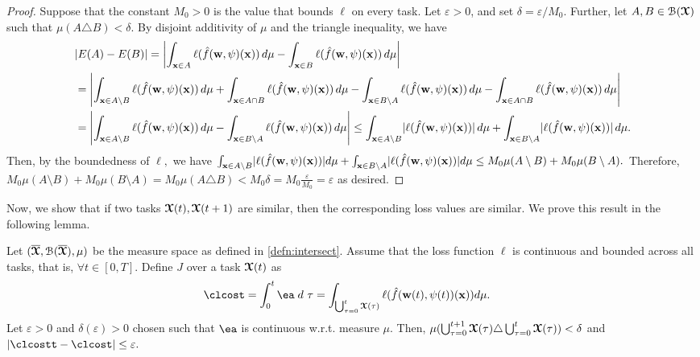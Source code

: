 \begin{proof}
    Suppose that the constant $M_0>0$ is the value that bounds $\ell$ on every task. Let $\varepsilon>0$, and set $\delta = \varepsilon/M_0.$ Further, let $A,B\in \mathcal{B}(\boldsymbol{\mathcal{X}})$ such that $\mu(A\triangle B)<\delta.$ By disjoint additivity of $\mu$ and the triangle inequality, we have
    {\small\begin{align*}
        & \lvert E(A)-E(B) \rvert = \left\vert \int_{\boldsymbol{\mathrm{x}}\in A}
       \ell(\hat{f}(\boldsymbol{\mathrm{w}},\psi)( \boldsymbol{\mathrm{x}} ))\,d\mu - \int_{\boldsymbol{\mathrm{x}}\in B}
       \ell(\hat{f}(\boldsymbol{\mathrm{w}},\psi)( \boldsymbol{\mathrm{x}} ))\,d\mu\right\vert \\ &= \left\vert \int_{\boldsymbol{\mathrm{x}}\in A\setminus B}
       \ell(\hat{f}(\boldsymbol{\mathrm{w}},\psi)( \boldsymbol{\mathrm{x}} ))\,d\mu + \int_{\boldsymbol{\mathrm{x}}\in A\cap B}
       \ell(\hat{f}(\boldsymbol{\mathrm{w}},\psi)( \boldsymbol{\mathrm{x}} ))\,d\mu - \int_{\boldsymbol{\mathrm{x}}\in B\setminus A}
       \ell(\hat{f}(\boldsymbol{\mathrm{w}},\psi)( \boldsymbol{\mathrm{x}} ))\,d\mu - \int_{\boldsymbol{\mathrm{x}}\in A\cap B}
       \ell(\hat{f}(\boldsymbol{\mathrm{w}},\psi)( \boldsymbol{\mathrm{x}} ))\,d\mu \right\vert \\
       & = \left\vert \int_{\boldsymbol{\mathrm{x}}\in A\setminus B}
       \ell(\hat{f}(\boldsymbol{\mathrm{w}},\psi)( \boldsymbol{\mathrm{x}} ))\,d\mu - \int_{\boldsymbol{\mathrm{x}}\in B\setminus A}
       \ell(\hat{f}(\boldsymbol{\mathrm{w}},\psi)( \boldsymbol{\mathrm{x}} ))\,d\mu\right\vert  \leq \int_{\boldsymbol{\mathrm{x}}\in A\setminus B}
       \lvert \ell(\hat{f}(\boldsymbol{\mathrm{w}},\psi)( \boldsymbol{\mathrm{x}} )) \rvert\,d\mu + \int_{\boldsymbol{\mathrm{x}} \in B\setminus A}
       \lvert \ell(\hat{f}(\boldsymbol{\mathrm{w}},\psi)( \boldsymbol{\mathrm{x}} )) \rvert\,d\mu.
    \end{align*}}
    Then, by the boundedness of $\ell,$ we have {\small$\int_{\boldsymbol{\mathrm{x}}\in A\setminus B} \lvert \ell(\hat{f}(\boldsymbol{\mathrm{w}},\psi
       )( \boldsymbol{\mathrm{x}} ) ) \rvert d\mu + \int_{\boldsymbol{\mathrm{x}}\in B\setminus A}
       \lvert \ell(\hat{f}(\boldsymbol{\mathrm{w}},\psi
       )( \boldsymbol{\mathrm{x}} ) ) \rvert d\mu \leq M_0\mu(A\setminus B)+M_0\mu(B\setminus A).$} Therefore, $  M_0\mu(A\setminus B)+M_0\mu(B\setminus A) = M_0 \mu(A\triangle B)<M_0\delta= M_0\frac{\varepsilon}{M_0}  = \varepsilon$
    as desired.
\end{proof}
Now, we show that if two tasks $\boldsymbol{\mathcal{X}}(t), \boldsymbol{\mathcal{X}}(t+1)$  are similar, then the corresponding loss values are similar. We prove this result in the following lemma. 
\begin{lemma}\label{lem:simtaskssimloss}
    Let $(\overline{\boldsymbol{\mathcal{X}}},\mathcal{B}(\overline{\boldsymbol{\mathcal{X}}}), \mu)$ be the measure space as defined in \cref{defn:intersect}. 
    Assume that the loss function $\ell$ is continuous 
    and bounded across all tasks, that is, $\forall t \in [0,T].$ 
    Define $J$ over a task $\boldsymbol{\mathcal{X}}(t)$ as
    \begin{align}
        \clcost & =\int_0^t \ea \;  d~\tau  = \int_{ \bigcup_{\tau=0}^t\tx(\tau)}       \ell(\fhat(\weight(t),\psi(t))( \vx ) )d\mu . 
    \end{align}
    Let $\varepsilon >0$ and $\delta(\varepsilon)>0$ chosen such that $\ea$ is continuous w.r.t. measure $\mu$.
    Then, 
    $\mu(\bigcup_{\tau = 0}^{t+1} \boldsymbol{\mathcal{X}}(\tau)\triangle \bigcup_{\tau = 0}^{t} \boldsymbol{\mathcal{X}}(\tau))<\delta$ and 
    $\abs{\clcostt- \clcost} \leq \varepsilon.$
\end{lemma}

